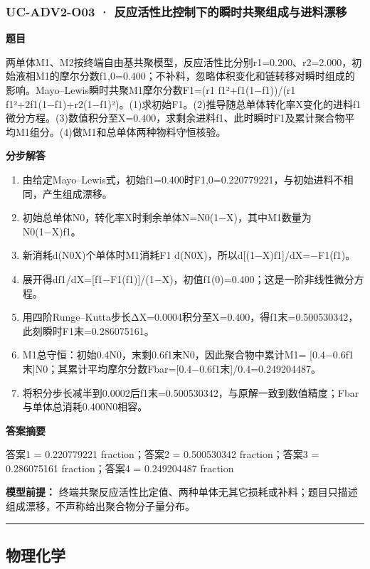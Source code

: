 \documentclass[UTF8,11pt,a4paper]{ctexart}
\begin{document}
\subsubsection*{UC-ADV2-O03 · 反应活性比控制下的瞬时共聚组成与进料漂移}
\noindent\textbf{题目}\par
两单体M1、M2按终端自由基共聚模型，反应活性比分别r1=0.200、r2=2.000，初始液相M1的摩尔分数f1,0=0.400；不补料，忽略体积变化和链转移对瞬时组成的影响。Mayo–Lewis瞬时共聚M1摩尔分数F1=(r1 f1²+f1(1−f1))/(r1 f1²+2f1(1−f1)+r2(1−f1)²)。(1)求初始F1。(2)推导随总单体转化率X变化的进料f1微分方程。(3)数值积分至X=0.400，求剩余进料f1、此时瞬时F1及累计聚合物平均M1组分。(4)做M1和总单体两种物料守恒核验。\par
\medskip\noindent\textbf{分步解答}
\begin{enumerate}
\item 由给定Mayo–Lewis式，初始f1=0.400时F1,0=0.220779221，与初始进料不相同，产生组成漂移。
\item 初始总单体N0，转化率X时剩余单体N=N0(1−X)，其中M1数量为N0(1−X)f1。
\item 新消耗d(N0X)个单体时M1消耗F1 d(N0X)，所以d[(1−X)f1]/dX=−F1(f1)。
\item 展开得df1/dX=[f1−F1(f1)]/(1−X)，初值f1(0)=0.400；这是一阶非线性微分方程。
\item 用四阶Runge–Kutta步长ΔX=0.0004积分至X=0.400，得f1末=0.500530342，此刻瞬时F1末=0.286075161。
\item M1总守恒：初始0.4N0，末剩0.6f1末N0，因此聚合物中累计M1= [0.4−0.6f1末]N0；其累计平均摩尔分数Fbar=[0.4−0.6f1末]/0.4=0.249204487。
\item 将积分步长减半到0.0002后f1末=0.500530342，与原解一致到数值精度；Fbar与单体总消耗0.400N0相容。
\end{enumerate}
\noindent\textbf{答案摘要}\par
答案1 = 0.220779221 fraction；答案2 = 0.500530342 fraction；答案3 = 0.286075161 fraction；答案4 = 0.249204487 fraction\par
\noindent\textbf{模型前提：}
终端共聚反应活性比定值、两种单体无其它损耗或补料；题目只描述组成漂移，不声称给出聚合物分子量分布。\par
\medskip\hrule\medskip
\subsection*{物理化学}
\end{document}
